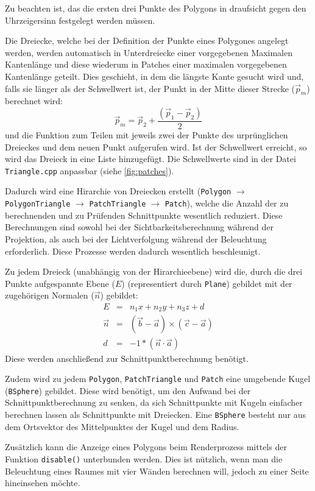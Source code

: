 \documentclass[final,a4paper,11pt,notitlepage,halfparskip]{scrreprt}
\begin{document}
Zu beachten ist, das die ersten drei Punkte des Polygons in draufsicht gegen den
Uhrzeigersinn festgelegt werden müssen.

Die Dreiecke, welche bei der Definition der Punkte eines Polygones angelegt
werden, werden automatisch in Unterdreiecke einer vorgegebenen Maximalen
Kantenlänge und diese wiederum in Patches einer maximalen vorgegebenen
Kantenlänge geteilt. Dies geschieht, in dem die längste Kante gesucht wird und,
falls sie länger als der Schwellwert ist, der Punkt in der Mitte dieser Strecke
($\vec{p}_m$) berechnet wird:
$$\vec{p}_m = \vec{p}_2 + \frac{(\vec{p}_1 - \vec{p}_2)}{2}$$
und die Funktion zum Teilen mit jeweils zwei der Punkte des urprünglichen 
Dreieckes und dem neuen Punkt aufgerufen wird. 
Ist der Schwellwert erreicht, so wird das Dreieck in eine Liste hinzugefügt. 
Die Schwellwerte sind in der Datei \texttt{Triangle.cpp} anpassbar (siehe
\ref{fig:patches}).

Dadurch wird eine Hirarchie von Dreiecken erstellt (\texttt{Polygon} 
$\rightarrow$ \texttt{PolygonTriangle} $\rightarrow$ \texttt{PatchTriangle} 
$\rightarrow$ \texttt{Patch}), welche die Anzahl der zu berechnenden und zu
Prüfenden Schnittpunkte wesentlich reduziert. Diese Berechnungen sind sowohl bei
der Sichtbarkeitsberechnung während der Projektion, als auch bei der
Lichtverfolgung während der Beleuchtung erforderlich. Diese Prozesse werden
dadurch wesentlich beschleunigt.

Zu jedem Dreieck (unabhängig von der Hirarchieebene) wird die, durch die drei
Punkte aufgespannte Ebene ($E$) (representiert durch \texttt{Plane}) gebildet 
mit der zugehörigen Normalen ($\vec{n}$) gebildet:
\begin{eqnarray*}
    E &=& n_1x + n_2y + n_3z + d\\
    \vec{n} &=& (\vec{b} - \vec{a}) \times (\vec{c} - \vec{a})\\
    d &=& -1 * (\vec{n} \cdot \vec{a})
\end{eqnarray*}
Diese werden anschließend zur Schnittpunktberechnung benötigt.

Zudem wird zu jedem \texttt{Polygon}, \texttt{PatchTriangle} und
\texttt{Patch} eine umgebende Kugel (\texttt{BSphere}) gebildet. Diese wird
benötigt, um den Aufwand bei der Schnittpunktberechnung zu senken, da sich
Schnittpunkte mit Kugeln einfacher berechnen lassen als Schnittpunkte mit
Dreiecken. Eine \texttt{BSphere} besteht nur aus dem Ortsvektor des
Mittelpunktes der Kugel und dem Radius.

Zusätzlich kann die Anzeige eines Polygons beim Renderprozess mittels der
Funktion \texttt{disable()} unterbunden werden. Dies ist nützlich, wenn man die
Beleuchtung eines Raumes mit vier Wänden berechnen will, jedoch zu einer Seite
hineinsehen möchte.
\end{document}
